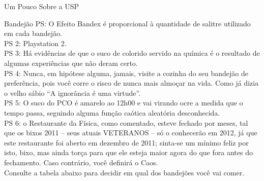 \begin{secao}{Um Pouco Sobre a USP}
\begin{subsecao}{Bandejão}
PS: O Efeito Bandex é proporcional à quantidade de salitre utilizado em cada bandejão.\\
PS 2: Playstation 2.\\
PS 3: Há evidências de que o suco de colorido servido na química é o resultado de algumas
experiências que não deram certo.\\
PS 4: Nunca, em hipótese alguma, jamais, visite a cozinha do seu bandejão de preferência,
pois você corre o risco de nunca mais almoçar na vida. Como já dizia o velho sábio ``A
ignorância é uma virtude''.\\
PS 5: O suco do PCO é amarelo ao 12h00 e vai virando ocre a medida que o tempo passa,
seguindo alguma função caótica aleatória desconhecida.\\
PS 6: o Restaurante da Física, como comentado, esteve fechado por meses, tal que os bixos 2011 – seus atuais VETERANOS – só o conhecerão em 2012, já que este restaurante foi aberto em dezembro de 2011; sinta-se um mínimo feliz por isto, bixo, mas ainda torça para que ele esteja maior agora do que fora antes do fechamento. Caso contrário, você definirá o Caos. \\
Consulte a tabela abaixo para decidir em qual dos bandejões você vai comer.


\end{subsecao}

\end{secao}
